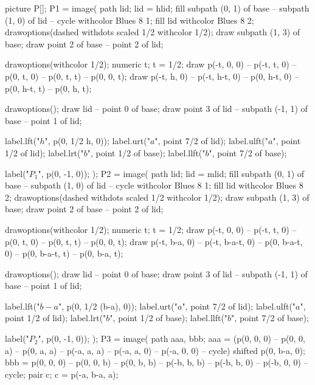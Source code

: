\documentclass[oneside]{scrbook}
\begin{document}
picture P[];
P1 = image(
    path lid; lid = hlid;
    fill subpath (0, 1) of base -- subpath (1, 0) of lid -- cycle withcolor Blues 8 1;
    fill lid withcolor Blues 8 2;
    drawoptions(dashed withdots scaled 1/2 withcolor 1/2);
    draw subpath (1, 3) of base;
    draw point 2 of base -- point 2 of lid;

    drawoptions(withcolor 1/2);
    numeric t; t = 1/2;
    draw p(-t, 0, 0) -- p(-t, t, 0) -- p(0, t, 0) -- p(0, t, t) -- p(0, 0, t);
    draw p(-t, h, 0) -- p(-t, h-t, 0) -- p(0, h-t, 0) -- p(0, h-t, t) -- p(0, h, t);

    drawoptions();
    draw lid -- point 0 of base;
    draw point 3 of lid -- subpath (-1, 1) of base -- point 1 of lid;

    label.lft("$h$", p(0, 1/2 h, 0));
    label.urt("$a$", point 7/2 of lid);
    label.ulft("$a$", point 1/2 of lid);
    label.lrt("$b$", point 1/2 of base);
    label.llft("$b$", point 7/2 of base);

    label("$P_1$", p(0, -1, 0));
);
P2 = image(
    path lid; lid = mlid;
    fill subpath (0, 1) of base -- subpath (1, 0) of lid -- cycle withcolor Blues 8 1;
    fill lid withcolor Blues 8 2;
    drawoptions(dashed withdots scaled 1/2 withcolor 1/2);
    draw subpath (1, 3) of base;
    draw point 2 of base -- point 2 of lid;

    drawoptions(withcolor 1/2);
    numeric t; t = 1/2;
    draw p(-t, 0, 0) -- p(-t, t, 0) -- p(0, t, 0) -- p(0, t, t) -- p(0, 0, t);
    draw p(-t, b-a, 0) -- p(-t, b-a-t, 0) -- p(0, b-a-t, 0) -- p(0, b-a-t, t) -- p(0, b-a, t);

    drawoptions();
    draw lid -- point 0 of base;
    draw point 3 of lid -- subpath (-1, 1) of base -- point 1 of lid;

    label.lft("$b-a$", p(0, 1/2 (b-a), 0));
    label.urt("$a$", point 7/2 of lid);
    label.ulft("$a$", point 1/2 of lid);
    label.lrt("$b$", point 1/2 of base);
    label.llft("$b$", point 7/2 of base);

    label("$P_2$", p(0, -1, 0));
);
P3 = image(
    path aaa, bbb;
    aaa = (p(0, 0, 0) --
           p(0, 0, a) --
           p(0, a, a) --
           p(-a, a, a) --
           p(-a, a, 0) --
           p(-a, 0, 0) -- cycle) shifted p(0, b-a, 0);
    bbb = p(0, 0, 0) --
          p(0, 0, b) --
          p(0, b, b) --
          p(-b, b, b) --
          p(-b, b, 0) --
          p(-b, 0, 0) -- cycle;
    pair c; c = p(-a, b-a, a);
\end{document}
